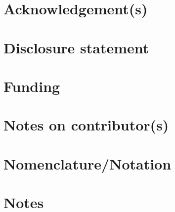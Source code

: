 \documentclass[]{interact}
\theoremstyle{plain}%
\theoremstyle{definition}
\theoremstyle{remark}
\begin{document}
\section*{Acknowledgement(s)}\label{acknowledgements}

\section*{Disclosure statement}\label{disclosure-statement}

\section*{Funding}\label{funding}

\section*{Notes on contributor(s)}\label{notes-on-contributors}

\section*{Nomenclature/Notation}\label{nomenclaturenotation}

\section*{Notes}\label{notes}






\end{document}
